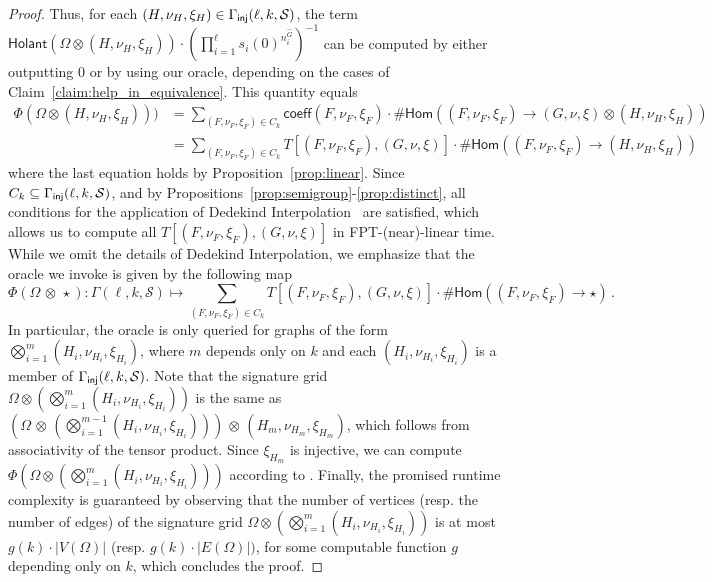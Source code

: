 \documentclass[authorcolumns,numberwithinsect]{no-lipics-v2022}
\newcommand{\homs}[2]{\mathsf{Hom}(#1 \to #2)}
\newcommand{\holant}{\mathsf{Holant}}
\begin{document}
\begin{proof}
     Thus, for each $(H,\nu_H,\xi_H) \in \Gamma_{\text{\sf{inj}}}(\ell,k,\mathcal{S})$, the term ${\holant(\Omega\otimes (H,\nu_H,\xi_H))}\cdot ({\prod_{i=1}^\ell s_i(0)^{n^{\hat{G}}_i}})^{-1}$ can be computed by either outputting $0$ or by using our oracle, depending on the cases of Claim~\ref{claim:help_in_equivalence}. This quantity equals
     \begin{align*}
        \Phi(\Omega \otimes (H,\nu_H,\xi_H))) &= \sum_{(F,\nu_F,\xi_F)\in C_k}\mathsf{coeff}(F,\nu_F,\xi_F) \cdot \#\homs{(F,\nu_F,\xi_F)}{(G,\nu,\xi)\otimes (H,\nu_H,\xi_H)} \\
        ~&=\sum_{(F,\nu_F,\xi_F)\in C_k} T[(F,\nu_F,\xi_F),(G,\nu,\xi)] \cdot \#\homs{(F,\nu_F,\xi_F)}{(H,\nu_H,\xi_H)}
     \end{align*}
     where the last equation holds by Proposition~\ref{prop:linear}.
     Since $C_k \subseteq \Gamma_{\text{\sf{inj}}}(\ell,k,\mathcal{S})$, and by Propositions~\ref{prop:semigroup}-\ref{prop:distinct}, all conditions for the application of Dedekind Interpolation~\cite[Theorem 18]{BLR2023stoc} are satisfied, which allows us to compute all $T[(F,\nu_F,\xi_F),(G,\nu,\xi)]$ in FPT-(near)-linear time. While we omit the details of Dedekind Interpolation, we emphasize that the oracle we invoke is given by the following map \[\Phi(\Omega\,\otimes\,\star) : \Gamma(\ell, k, \mathcal{S}) \mapsto \sum_{(F,\nu_F,\xi_F)\in C_k} T[(F,\nu_F,\xi_F),(G,\nu,\xi)] \cdot \#\homs{(F,\nu_F,\xi_F)}{\star}\,.\]
     In particular, the oracle is only queried for graphs of the form $\bigotimes_{i=1}^m(H_i, \nu_{H_i}, \xi_{H_i})$, where $m$ depends only on $k$ and each $(H_i, \nu_{H_i}, \xi_{H_i})$ is a member of $\Gamma_{\text{\sf{inj}}}(\ell, k, \mathcal{S})$. Note that the signature grid $\Omega \otimes \left(\bigotimes_{i=1}^m(H_i, \nu_{H_i}, \xi_{H_i})\right)$ is the same as $\left(\Omega\,\otimes\,\left(\bigotimes_{i=1}^{m-1}(H_i, \nu_{H_i}, \xi_{H_i})\right)\right)\,\otimes\,(H_m, \nu_{H_m}, \xi_{H_m})$, which follows from associativity of the tensor product. Since $\xi_{H_m}$ is injective, we can compute $\Phi\left(\Omega \otimes \left(\bigotimes_{i=1}^m(H_i, \nu_{H_i}, \xi_{H_i})\right)\right)$ according to . Finally, the promised runtime complexity is guaranteed by observing that the number of vertices (resp. the number of edges) of the signature grid $\Omega \otimes \left(\bigotimes_{i=1}^m(H_i, \nu_{H_i}, \xi_{H_i})\right)$ is at most $g(k)\cdot |V(\Omega)|$ (resp. $g(k)\cdot|E(\Omega)|)$, for some computable function $g$ depending only on $k$, which concludes the proof.
\end{proof}
\end{document}
